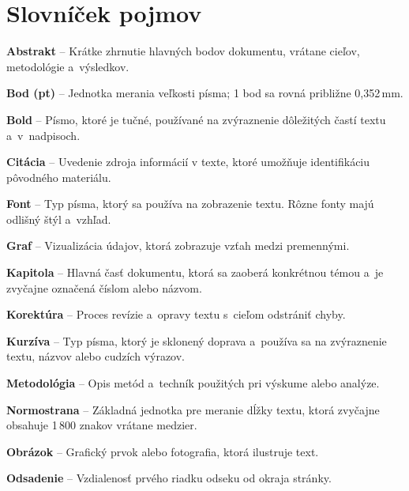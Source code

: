 \chapter{Slovníček pojmov\label{att:dictionary}}

\begin{trivlist}
  \item{\textbf{Abstrakt}} -- Krátke zhrnutie hlavných bodov dokumentu, vrátane cieľov, metodológie a~výsledkov.

  \item{\textbf{Bod (pt)}} -- Jednotka merania veľkosti písma; 1 bod sa rovná približne 0,352\,mm.
  
  \item{\textbf{Bold}} -- Písmo, ktoré je tučné, používané na zvýraznenie dôležitých častí textu a~v~nadpisoch.
  
  \item{\textbf{Citácia}} -- Uvedenie zdroja informácií v texte, ktoré umožňuje identifikáciu pôvodného materiálu.
  
  \item{\textbf{Font}} -- Typ písma, ktorý sa používa na zobrazenie textu. Rôzne fonty majú odlišný štýl a~vzhľad.
  
  \item{\textbf{Graf}} -- Vizualizácia údajov, ktorá zobrazuje vzťah medzi premennými.
  
  \item{\textbf{Kapitola}} -- Hlavná časť dokumentu, ktorá sa zaoberá konkrétnou témou a~je zvyčajne označená číslom alebo názvom.
  
  \item{\textbf{Korektúra}} -- Proces revízie a~opravy textu s~cieľom odstrániť chyby.
  
  \item{\textbf{Kurzíva}} -- Typ písma, ktorý je sklonený doprava a~používa sa na zvýraznenie textu, názvov alebo cudzích výrazov.
  
  \item{\textbf{Metodológia}} -- Opis metód a~techník použitých pri výskume alebo analýze.
  
  \item{\textbf{Normostrana}} -- Základná jednotka pre meranie dĺžky textu, ktorá zvyčajne obsahuje 1\,800 znakov vrátane medzier.
  
  \item{\textbf{Obrázok}} -- Grafický prvok alebo fotografia, ktorá ilustruje text.
  
  \item{\textbf{Odsadenie}} -- Vzdialenosť prvého riadku odseku od okraja stránky.
  

\end{trivlist}
